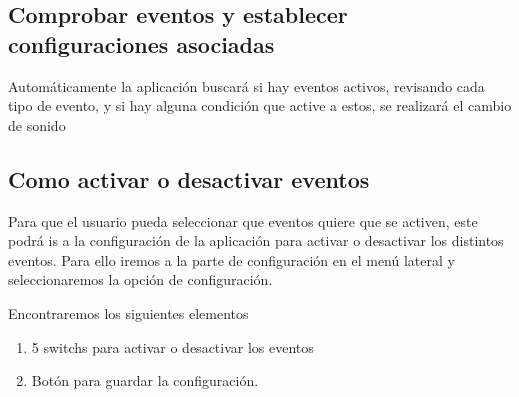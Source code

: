 \subsection{Comprobar eventos y establecer configuraciones asociadas}

Automáticamente la aplicación buscará si hay eventos activos, revisando cada tipo de evento, y si hay alguna condición que active a estos, se realizará el cambio de sonido


\subsection{Como activar o desactivar eventos}
Para que el usuario pueda seleccionar que eventos quiere que se activen, este podrá is a la configuración de la aplicación para activar o desactivar los distintos eventos.
Para ello iremos a la parte de configuración en el menú lateral y seleccionaremos la opción de configuración.

Encontraremos los siguientes elementos
\begin{enumerate}
\item 5 switchs para activar o desactivar los eventos
\item Botón para guardar la configuración.
\end{enumerate}

